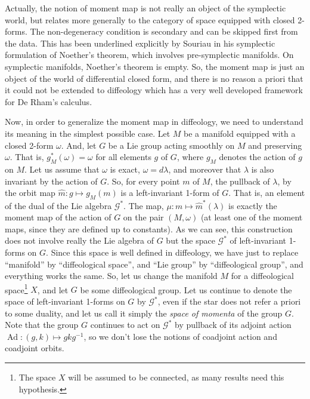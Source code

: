 \documentclass[10pt,reqno,twoside]{amsart}
\newcommand{\cG}{\mathcal{G}}
\DeclareMathOperator{\Ad}{Ad}
\theoremstyle{plain}
\theoremstyle{definition}
\begin{document}
  Actually,
  the notion of moment map is not really an object of the symplectic world,
  but relates more generally to the category of space equipped with closed 2-forms.
  The non-degeneracy condition is secondary and can be skipped first from the data.
  This has been underlined explicitly by Souriau in his symplectic formulation of Noether's theorem,
  which involves pre-symplectic manifolds.
  On symplectic manifolds,
  Noether's theorem is empty.
  So,
  the moment map is just an object of the world of differential closed form,
  and there is no reason a priori that it could not be extended to diffeology which has a very well developed framework for De Rham's calculus.
  
  Now,
  in order to generalize the moment map in diffeology,
  we need to understand its meaning in the simplest possible case.
  Let $M$ be a manifold equipped with a closed 2-form $\omega$.
  And,
  let $G$ be a Lie group acting smoothly on $M$ and preserving $\omega$.
  That is,
  $g_M^*(\omega) = \omega$ for all elements $g$ of $G$,
  where $g_M$ denotes the action of $g$ on $M$.
  Let us assume that $\omega$ is exact,
  $\omega = d \lambda$,
  and moreover that $\lambda$ is also invariant by the action of $G$.
  So,
  for every point $m$ of $M$,
  the pullback of $\lambda$,
  by the orbit map $\hat m : g \mapsto g_M(m)$ is a left-invariant 1-form of $G$.
  That is,
  an element of the dual of the Lie algebra $\cG^*$.
  The map,
  $\mu : m \mapsto \hat m^*(\lambda)$ is exactly the moment map of the action of $G$ on the pair $(M,\omega)$
  (at least one of the moment maps, since they are defined up to constants).
  As we can see,
  this construction does not involve really the Lie algebra of $G$ but the space $\cG^*$ of left-invariant 1-forms on $G$.
  Since this space is well defined in diffeology,
  we have just to replace ``manifold'' by ``diffeological space'',
  and ``Lie group'' by ``diffeological group'',
  and everything works the same.
  So,
  let us change the manifold $M$ for a diffeological space\footnote{The space $X$ will be assumed to be connected, as many results need this hypothesis.} $X$,
  and let $G$ be some diffeological group.
  Let us continue to denote the space of left-invariant 1-forms on $G$ by $\cG^*$,
  even if the star does not refer a priori to some duality,
  and let us call it simply the {\em space of momenta} of the group $G$.
  Note that the group $G$ continues to act on $\cG^*$ by pullback of its adjoint action $\Ad : (g,k) \mapsto gkg^{-1}$,
  so we don't lose the notions of coadjoint action and coadjoint orbits.
  
\end{document}
